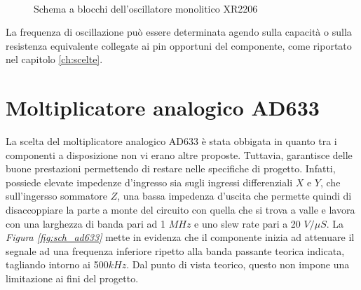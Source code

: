 \documentclass[titlepage]{report}
\begin{document}
	\begin{figure}[H]
		\centering
		 \qquad
		 \\
		\caption{Schema a blocchi dell'oscillatore monolitico XR2206}
		\label{fig:sch_xr2206}
	\end{figure}

	La frequenza di oscillazione può essere determinata agendo sulla capacità o sulla resistenza equivalente collegate ai pin opportuni del componente, come riportato nel capitolo \ref{ch:scelte}.
	
	
\section{Moltiplicatore analogico AD633}
	\label{sec:AD633}
	La scelta del moltiplicatore analogico AD633 è stata obbigata in quanto tra i componenti a disposizione non vi erano altre proposte.
	Tuttavia, garantisce delle buone prestazioni permettendo di restare nelle specifiche di progetto.
	Infatti, possiede elevate impedenze d'ingresso sia sugli ingressi differenziali $X$ e $Y$, che sull'ingersso sommatore $Z$, una bassa impedenza d'uscita che permette quindi di disaccoppiare la parte a monte del circuito con quella che si trova a valle e lavora con una larghezza di banda pari ad 1 $MHz$ e uno slew rate pari a 20 $V/\mu S$. 
	La \textit{Figura \ref{fig:sch_ad633}} mette in evidenza che il componente inizia ad attenuare il segnale ad una frequenza inferiore ripetto alla banda passante teorica indicata, tagliando intorno ai 500$kHz$. Dal punto di vista teorico, questo non impone una limitazione ai fini del progetto.
\end{document}

